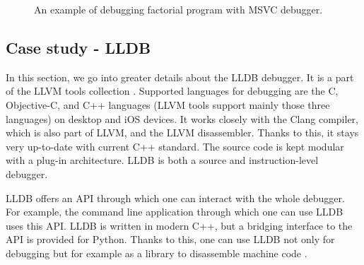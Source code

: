 \begin{figure}
    \caption{An example of debugging factorial program with MSVC debugger.}
    \label{fig:msvc}
\end{figure}

\subsection{Case study - LLDB}\label{section:case-study}
In this section, we go into greater details about the LLDB \cite{lldb}
debugger. It is a part of the LLVM tools collection \cite{llvm}. Supported
languages for debugging are the C, Objective-C, and C++ languages (LLVM tools
support mainly those three languages) on desktop and iOS devices. It works
closely with the Clang compiler, which is also part of LLVM, and the LLVM
disassembler. Thanks to this, it stays very up-to-date with current C++
standard. The source code is kept modular with a plug-in architecture. LLDB is
both a source and instruction-level debugger.

LLDB offers an API through which one can interact with the whole debugger. For
example, the command line application through which one can use LLDB uses this
API. LLDB is written in modern C++, but a bridging interface to the API is
provided for Python. Thanks to this, one can use LLDB not only for debugging
but for example as a library to disassemble machine code \cite{lldb}.

